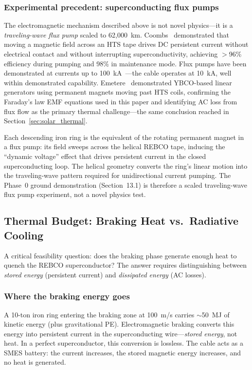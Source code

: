 \documentclass[12pt,letterpaper]{article}
\begin{document}
\subsubsection{Experimental precedent: superconducting flux pumps}

The electromagnetic mechanism described above is not novel physics---it is a \emph{traveling-wave flux pump} scaled to 62{,}000~km. Coombs~\cite{coombs2019} demonstrated that moving a magnetic field across an HTS tape drives DC persistent current without electrical contact and without interrupting superconductivity, achieving $>$96\% efficiency during pumping and 98\% in maintenance mode. Flux pumps have been demonstrated at currents up to 100~kA~\cite{coombs2019}---the cable operates at 10~kA, well within demonstrated capability. Emetere~\cite{emetere2024} demonstrated YBCO-based linear generators using permanent magnets moving past HTS coils, confirming the Faraday's law EMF equations used in this paper and identifying AC loss from flux flow as the primary thermal challenge---the same conclusion reached in Section~\ref{sec:solar_thermal}.

Each descending iron ring is the equivalent of the rotating permanent magnet in a flux pump: its field sweeps across the helical REBCO tape, inducing the ``dynamic voltage'' effect that drives persistent current in the closed superconducting loop. The helical geometry converts the ring's linear motion into the traveling-wave pattern required for unidirectional current pumping. The Phase~0 ground demonstration (Section~13.1) is therefore a scaled traveling-wave flux pump experiment, not a novel physics test.

\subsection{Thermal Budget: Braking Heat vs.\ Radiative Cooling}

A critical feasibility question: does the braking phase generate enough heat to quench the REBCO superconductor? The answer requires distinguishing between \emph{stored energy} (persistent current) and \emph{dissipated energy} (AC losses).

\subsubsection{Where the braking energy goes}

A 10-ton iron ring entering the braking zone at 100~m/s carries $\sim$50~MJ of kinetic energy (plus gravitational PE). Electromagnetic braking converts this energy into persistent current in the superconducting wire---\emph{stored energy}, not heat. In a perfect superconductor, this conversion is lossless. The cable acts as a SMES battery: the current increases, the stored magnetic energy increases, and no heat is generated.
\end{document}
